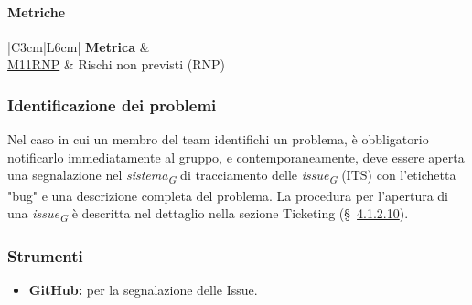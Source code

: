 \paragraph{Metriche}
\begin{table}[H]
    \centering
    \begin{tabular}{|C{3cm}|L{6cm}|}
    \hline
    \textbf{Metrica} &  \\
    \hline \hline
    \hyperlink{item:M11RNP}{M11RNP} & Rischi non previsti (RNP) \\ 
    \hline
    \end{tabular}
    \caption{Metriche relative alla gestione dei processi}
\end{table}

\subsubsection{Identificazione dei problemi}
Nel caso in cui un membro del team identifichi un problema, è obbligatorio notificarlo immediatamente al gruppo, e contemporaneamente, deve essere aperta una segnalazione nel \textit{sistema}\textsubscript{\textit{G}} di tracciamento delle \textit{issue}\textsubscript{\textit{G}} (ITS) con l'etichetta "bug" e una descrizione completa del problema. La procedura per l'apertura di una \textit{issue}\textsubscript{\textit{G}} è descritta nel dettaglio nella sezione Ticketing (\S~\hyperlink{par:ticketing}{4.1.2.10}).

\subsubsection{Strumenti}
\begin{itemize}
    \item \textbf{GitHub:} per la segnalazione delle Issue.
\end{itemize}